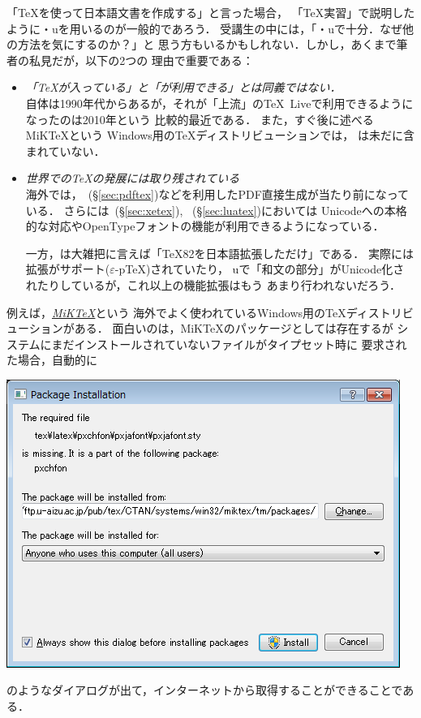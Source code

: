 \documentclass[b5paper]{bxjsarticle} %
\begin{document}
「\TeX を使って日本語文書を作成する」と言った場合，
「\TeX 実習」で説明したように\pTeX ・u\pTeX を用いるのが一般的であろう．
受講生の中には，「\pTeX ・u\pTeX で十分．なぜ他の方法を気にするのか？」と
思う方もいるかもしれない．しかし，あくまで筆者の私見だが，以下の2つの
理由で重要である：
\begin{itemize}
 \item \emph{「\TeX が入っている」と「\pTeX が利用できる」とは同義ではない．}\\
\pTeX 自体は1990年代からあるが，それが「上流」の\TeX~Liveで利用できるようになったのは2010年という
比較的最近である．
また，すぐ後に述べるMiK\TeX という
Windows用の\TeX ディストリビューションでは，
\pTeX は未だに含まれていない．
 \item \emph{世界での\TeX の発展に\pTeX は取り残されている}\\
海外では，\pdfTeX~(\S\ref{sec:pdftex})などを利用したPDF直接生成が当たり前になっている．
さらには\XeTeX~(\S\ref{sec:xetex}), \LuaTeX~(\S\ref{sec:luatex})においては
Unicodeへの本格的な対応やOpenTypeフォントの機能が利用できるようになっている．

一方，\pTeX は大雑把に言えば「\TeX82を日本語拡張しただけ」である．
実際には\eTeX 拡張がサポート($\varepsilon$-p\TeX)されていたり，
u\pTeX で「和文の部分」がUnicode化されたりしているが，これ以上の機能拡張はもう
あまり行われないだろう．
\end{itemize}


例えば，\href{https://miktex.org/}{\emph{MiK\TeX}}\>という
海外でよく使われているWindows用の\TeX ディストリビューションがある．
面白いのは，MiK\TeX のパッケージとしては存在するが
システムにまだインストールされていないファイルがタイプセット時に
要求された場合，自動的に
\begin{center}
\includegraphics[scale=0.5]{mik-inst.png}
\end{center}
のようなダイアログが出て，インターネットから取得することができることである．
\end{document}
